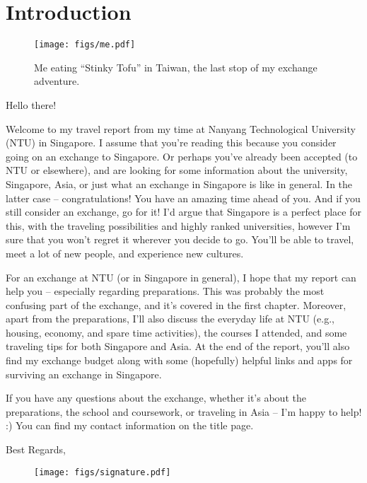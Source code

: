 \chapter*{Introduction}

\begin{wrapfigure}{r}{0.32\textwidth}
    \vspace{0.25cm}
    \centering
    \texttt{[image: figs/me.pdf]}
    \vspace{-0.15cm}
    \caption{Me eating ``Stinky Tofu'' in Taiwan, the last stop of my exchange adventure.}
    \vspace{-0.7cm}
\end{wrapfigure}
Hello there! 

Welcome to my travel report from my time at Nanyang Technological University (NTU) in Singapore. I assume that you're reading this because you consider going on an exchange to Singapore. Or perhaps you've already been accepted (to NTU or elsewhere), and are looking for some information about the university, Singapore, Asia, or just what an exchange in Singapore is like in general. In the latter case -- congratulations! You have an amazing time ahead of you. And if you still consider an exchange, go for it! I'd argue that Singapore is a perfect place for this, with the traveling possibilities and highly ranked universities, however I'm sure that you won't regret it wherever you decide to go. You'll be able to travel, meet a lot of new people, and experience new cultures.

For an exchange at NTU (or in Singapore in general), I hope that my report can help you -- especially regarding preparations. This was probably the most confusing part of the exchange, and it's covered in the first chapter. Moreover, apart from the preparations, I'll also discuss the everyday life at NTU (e.g., housing, economy, and spare time activities), the courses I attended, and some traveling tips for both Singapore and Asia. At the end of the report, you'll also find my exchange budget along with some (hopefully) helpful links and apps for surviving an exchange in Singapore.

If you have any questions about the exchange, whether it's about the preparations, the school and coursework, or traveling in Asia -- I'm happy to help! :) You can find my contact information on the title page.

Best Regards, \\
\vspace{-0.9cm}
\begin{wrapfigure}{l}{0.35\textwidth}
    \centering
    \texttt{[image: figs/signature.pdf]}
\end{wrapfigure}
